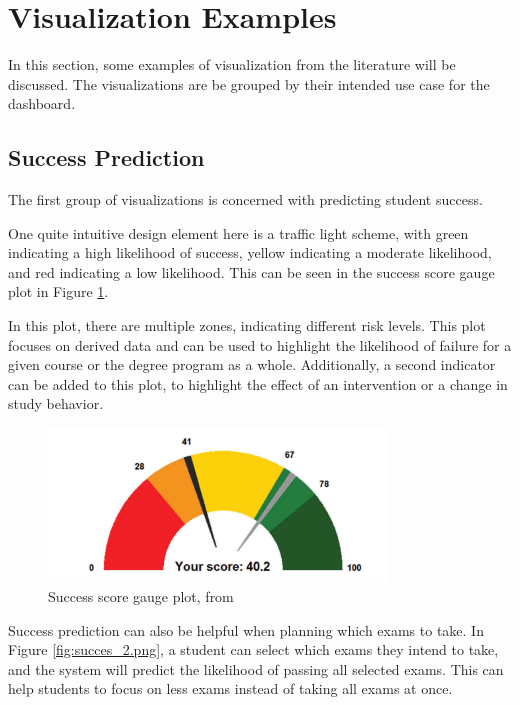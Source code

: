 \section{Visualization Examples}
\label{sec:examples}

In this section, some examples of visualization from the literature will be discussed. The visualizations are be grouped by their intended use case for the dashboard.

\subsection{Success Prediction}
\label{subsec:success_prediction}

The first group of visualizations is concerned with predicting student success.

One quite intuitive design element here is a traffic light scheme, with green indicating a high likelihood of success, yellow indicating a moderate likelihood, and red indicating a low likelihood. This can be seen in the success score gauge plot in Figure \ref{fig:trajectory}.

In this plot, there are multiple zones, indicating different risk levels. This plot focuses on derived data and can be used to highlight the likelihood of failure for a given course or the degree program as a whole. Additionally, a second indicator can be added to this plot, to highlight the effect of an intervention or a change in study behavior.


\begin{figure}
    \centering
    \includegraphics[width=0.8\textwidth]{figures/success_1.png}
    \caption{Success score gauge plot, from \cite{PredictingSuccess}}
    \label{fig:trajectory}
\end{figure}

Success prediction can also be helpful when planning which exams to take. In Figure \ref{fig:succes_2.png}, a student can select which exams they intend to take, and the system will predict the likelihood of passing all selected exams.
This can help students to focus on less exams instead of taking all exams at once.

